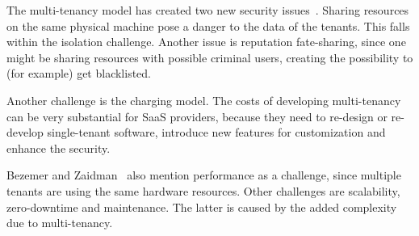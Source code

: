 The multi-tenancy model has created two new security issues~\cite{dillon2010cloud}. Sharing resources on the same physical machine pose a danger to the data of the tenants. This falls within the isolation challenge. Another issue is reputation fate-sharing, since one might be sharing resources with possible criminal users, creating the possibility to (for example) get blacklisted.

Another challenge is the charging model. The costs of developing multi-tenancy can be very substantial for SaaS providers, because they need to re-design or re-develop single-tenant software, introduce new features for customization and enhance the security.

Bezemer and Zaidman~\cite{bezemer2010multi} also mention performance as a challenge, since multiple tenants are using the same hardware resources. Other challenges are scalability, zero-downtime and maintenance. The latter is caused by the added complexity due to multi-tenancy.